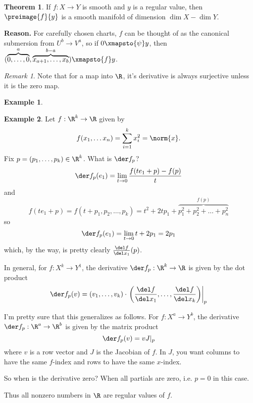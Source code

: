 \documentclass[a5paper]{article}
\theoremstyle{definition}%
\newtheorem{theorem}{Theorem}
\newtheorem*{example*}{Example}
\numberwithin{exercise}{section}
\theoremstyle{remark}%
\newtheorem*{remark*}{Remark}
\begin{document}
\begin{highlight}
\begin{theorem}
If $f:X\to Y$ is smooth and $y$ is a regular value, then $\preimage{f}{y}$ is a smooth manifold of dimension $\dim X-\dim Y$. 
\end{theorem}

\noindent \textbf{Reason.} For carefully chosen charts, $f$ can be thought of as the canonical submersion from $U^b\to V^a$, so if $0\xmapsto{\psi} y$, then $(\overbrace{0,\dots, 0}^{a},\overbrace{x_{a+1}, \dots, x_b}^{b-a})\xmapsto{f}y$. 
\end{highlight}

\begin{remark*}
Note that for a map into $\R$, it's derivative is always surjective unless it is the zero map. 
\end{remark*}

\begin{example*}\mbox{}
\end{example*}

\begin{example*}
Let $f:\R^k\to \R$ given by $$f(x_1, \dots	x_n)=\sum_{i=1}^k x_i^2 = \norm{x}.$$ Fix $p=(p_1, \dots, p_k)\in \R^k$. What is $\der f_p$?
$$\der	f_p(e_1) = \lim_{t\to0} \frac{f(te_1+p)-f(p)}{t}$$
and 
$$ f(te_1+p)=f(t+p_1, p_2, \dots, p_k) = t^2 + 2tp_1 + \overbrace{p_1^2 + p_2^2 + \dots + p_n^2}^{f(p)} $$
so 
$$\der	f_p(e_1) = \lim_{t\to 0}t+2p_1 = 2p_1$$
which, by the way, is pretty clearly $\frac{\del f}{\del x_1}(p)$. 

\begin{highlight}
In general, for $f:X^k\to Y^1$, the derivative $\der f_p:\R^k\to \R$ is given by the dot product
$$\der f_p(v)=(v_1, \dots, v_k)\cdot\left.\left(\frac{\del f}{\del x_1}, \dots, \frac{\del f}{\del x_k}\right)\right|_p$$
\end{highlight}

\begin{highlight}
I'm pretty sure that this generalizes as follows. For $f:X^a\to Y^b$, the derivative $\der f_p:\R^a\to \R^b$ is given by the matrix product
$$\der f_p(v) = vJ|_p$$
where $v$ is a row vector and $J$ is the Jacobian of $f$. In $J$, you want columns to have the same $f$-index and rows to have the same $x$-index. 
\end{highlight}

So when is the derivative zero? When all partials are zero, i.e. $p=0$ in this case. 

Thus all nonzero numbers in $\R$ are regular values of $f$. 
\end{example*}
\end{document}
